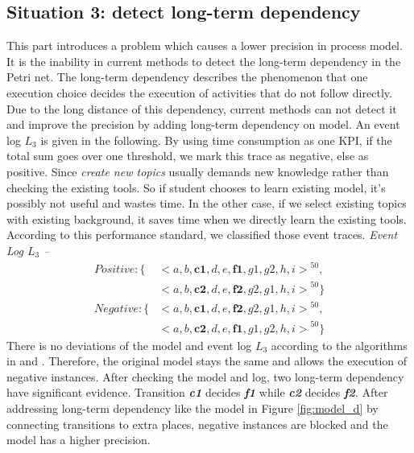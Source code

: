 \subsection{Situation 3: \small{detect long-term dependency}}
This part introduces a problem which causes a lower precision in process model. It is the inability in current methods to detect the long-term dependency in the Petri net. The long-term dependency describes the phenomenon that one execution choice decides the execution of activities that do not follow directly. Due to the long distance of this dependency, current methods can not detect it and improve the precision by adding long-term dependency on model. 
An event log $L_3$ is given in the following. By using time consumption as one KPI, if the total sum goes over one threshold, we mark this trace as negative, else as positive. Since \emph{create new topics} usually demands new knowledge rather than checking the existing tools. So if student chooses to learn existing model, it's possibly not useful and wastes time. In the other case, if we select existing topics with existing background, it saves time when we directly learn the existing tools. According to this performance standard, we classified those event traces.
\emph{Event Log $L_3$ -- }
\begin{align*}
Positive:\{ & { <a,b,\textbf{c1},d,e,\textbf{f1},g1,g2, h,i>}^{50}, \\   &{<a,b,\textbf{c2},d,e,\textbf{f2},g2,g1, h,i>}^{50} \}  \\
Negative: \{ & {<a,b,\textbf{c1},d,e,\textbf{f2},g2,g1,h,i>}^{50}, \\
& {<a,b,\textbf{c2},d,e,\textbf{f1},g1,g2,h,i>}^{50}  \}
\end{align*}
There is no deviations of the model and event log $L_3$ according to the  algorithms in \cite{fahland2015model} and \cite{dees2017enhancing}. Therefore, the original model stays the same and allows the execution of negative instances. After checking the model and log, two long-term dependency have significant evidence. Transition \textbf{\emph{c1}} decides \textbf{\emph{f1}} while \textbf{\emph{c2}} decides \textbf{\emph{f2}}.  After addressing long-term dependency like the model in Figure \ref{fig:model_d} by connecting transitions to extra places, 
negative instances are blocked and the model has a higher precision.

